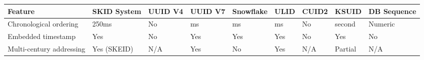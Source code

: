 \documentclass[fleqn,10pt,lineno]{wlpeerj}
\begin{document}
{\def\LTcaptype{none} %
\begin{longtable}[]{@{}
  >{\raggedright\arraybackslash}p{}
  >{\raggedright\arraybackslash}p{}
  >{\raggedright\arraybackslash}p{}
  >{\raggedright\arraybackslash}p{}
  >{\raggedright\arraybackslash}p{}
  >{\raggedright\arraybackslash}p{}
  >{\raggedright\arraybackslash}p{}
  >{\raggedright\arraybackslash}p{}
  >{\raggedright\arraybackslash}p{}@{}}
\toprule\noalign{}
\begin{minipage}[b]{\linewidth}\raggedright
Feature
\end{minipage} & \begin{minipage}[b]{\linewidth}\raggedright
SKID System
\end{minipage} & \begin{minipage}[b]{\linewidth}\raggedright
UUID V4
\end{minipage} & \begin{minipage}[b]{\linewidth}\raggedright
UUID V7
\end{minipage} & \begin{minipage}[b]{\linewidth}\raggedright
Snowflake
\end{minipage} & \begin{minipage}[b]{\linewidth}\raggedright
ULID
\end{minipage} & \begin{minipage}[b]{\linewidth}\raggedright
CUID2
\end{minipage} & \begin{minipage}[b]{\linewidth}\raggedright
KSUID
\end{minipage} & \begin{minipage}[b]{\linewidth}\raggedright
DB Sequence
\end{minipage} \\
\midrule\noalign{}
\endhead
\bottomrule\noalign{}
\endlastfoot
Chronological ordering & 250ms & No & ms & ms & ms & No & second &
Numeric \\
Embedded timestamp & Yes & No & Yes & Yes & Yes & No & Yes & No \\
Multi-century addressing & Yes (SKEID) & N/A & Yes & No & Yes & N/A &
Partial & N/A \\

\end{longtable}}
\end{document}
